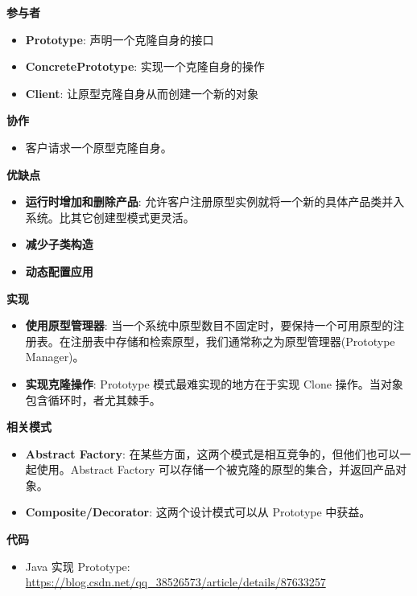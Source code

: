 \noindent\textbf{参与者}
\begin{itemize}
    \item \textbf{Prototype}: 声明一个克隆自身的接口
    \item \textbf{ConcretePrototype}: 实现一个克隆自身的操作
    \item \textbf{Client}: 让原型克隆自身从而创建一个新的对象
\end{itemize}

\noindent\textbf{协作}

\begin{itemize}
    \item 客户请求一个原型克隆自身。
\end{itemize}

\noindent\textbf{优缺点}

\begin{itemize}
    \item \textbf{运行时增加和删除产品}: 允许客户注册原型实例就将一个新的具体产品类并入系统。比其它创建型模式更灵活。
    \item \textbf{减少子类构造}
    \item \textbf{动态配置应用}
\end{itemize}

\noindent\textbf{实现}

\begin{itemize}
    \item \textbf{使用原型管理器}: 当一个系统中原型数目不固定时，要保持一个可用原型的注册表。在注册表中存储和检索原型，我们通常称之为原型管理器(Prototype Manager)。
    \item \textbf{实现克隆操作}: Prototype 模式最难实现的地方在于实现 Clone 操作。当对象包含循环时，者尤其棘手。
\end{itemize}

\noindent\textbf{相关模式}

\begin{itemize}
    \item \textbf{Abstract Factory}: 在某些方面，这两个模式是相互竞争的，但他们也可以一起使用。Abstract Factory 可以存储一个被克隆的原型的集合，并返回产品对象。
    \item \textbf{Composite/Decorator}: 这两个设计模式可以从 Prototype 中获益。
\end{itemize}

\noindent\textbf{代码}

\begin{itemize}
    \item Java 实现 Prototype: \url{https://blog.csdn.net/qq_38526573/article/details/87633257}
\end{itemize}



\newpage